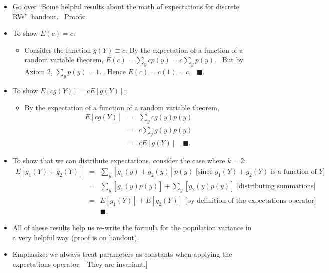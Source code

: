 \documentclass[11pt]{article}
\begin{document}
\begin{itemize}
\item Go over \textquotedblleft Some helpful results about the math of
expectations for discrete RVs\textquotedblright\ handout. \ Proofs:

\item To show $E(c)=c$:

\begin{itemize}
\item Consider the function $g(Y)\equiv c.$ By the expectation of a function
of a random variable theorem, $E(c)=\sum_{y}cp(y)=c\sum_{y}p(y).$ \ But by
Axiom 2, $\sum_{y}p(y)=1.$ \ Hence $E(c)=c(1)=c.$ \ $\blacksquare .$
\end{itemize}

\item To show $E[cg(Y)]=cE[g(Y)]$:

\begin{itemize}
\item By the expectation of a function of a random variable theorem,%
\begin{eqnarray*}
E[cg(Y)] &=&\sum_{y}cg(y)p(y) \\
&=&c\sum_{y}g(y)p(y) \\
&=&cE[g(Y)]\quad \blacksquare .
\end{eqnarray*}
\end{itemize}

\item To show that we can distribute expectations, consider the case where $%
k=2$:%
\begin{eqnarray*}
E[g_{1}(Y)+g_{2}(Y)] &=&\sum_{y}[g_{1}(y)+g_{2}(y)]p(y)\text{ \ \ [since }%
g_{1}(Y)+g_{2}(Y)\text{ is a function of }Y\text{]} \\
&=&\sum_{y}[g_{1}(y)p(y)]+\sum_{y}[g_{2}(y)p(y)]\text{ \ \ \ [distributing
summations]} \\
&=&E[g_{1}(Y)]+E[g_{2}(Y)]\text{ \ \ \ [by definition of the expectations
operator]} \\
&&\blacksquare .
\end{eqnarray*}

\item All of these results help us re-write the formula for the population
variance in a very helpful way (proof is on handout).

\item \lbrack Emphasize: we always treat parameters as constants when
applying the expectations operator. \ They are invariant.]
\end{itemize}
\end{document}
